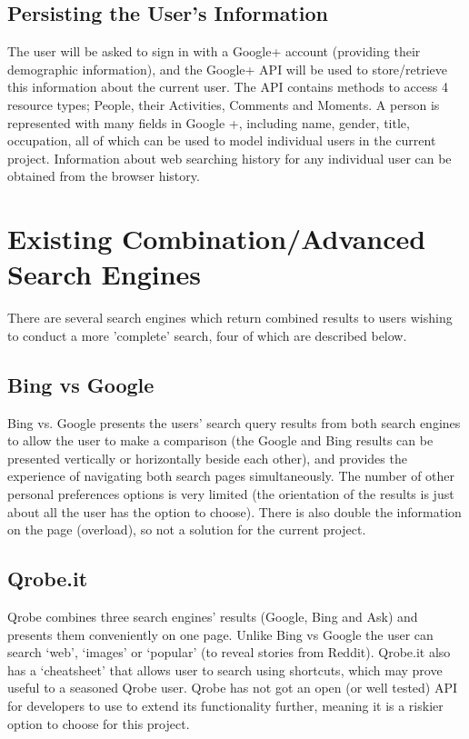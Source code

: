 \documentclass[10pt]{article}
\begin{document}
\subsection{Persisting the User's Information}
The user will be asked to sign in with a Google+ account (providing their demographic information), and the Google+ API will be used to store/retrieve this information about the current user. The API contains methods to access 4 resource  types; People, their Activities, Comments and Moments. A person is represented with many fields in Google +, including name, gender, title, occupation, all of which can be used to model individual users in the current project. Information about web searching history for any individual user can be obtained from the browser history. 

\section{Existing Combination/Advanced Search Engines}\label{Existing Combination/Advanced Search Engines}
There are several search engines which return combined results to users wishing to conduct a more 'complete' search, four of which are described below. 

\subsection{Bing vs Google}
Bing vs. Google presents the users’ search query results from both search engines to allow the user to make a comparison (the Google and Bing results can be presented vertically or horizontally beside each other), and provides the experience of navigating both search pages simultaneously.  
The number of other personal preferences options is very limited (the orientation of the results is just about all the user has the option to choose). There is also double the information on the page (overload), so not a solution for the current project.

\subsection{Qrobe.it}
Qrobe combines three search engines’ results (Google, Bing and Ask) and presents them conveniently on one page. Unlike Bing vs Google the user can search ‘web’, ‘images’ or ‘popular’ (to reveal stories from Reddit). Qrobe.it also has a ‘cheatsheet’ that allows user to search using shortcuts, which may prove useful to a seasoned Qrobe user. Qrobe has not got an open (or well tested) API for developers to use to extend its functionality further, meaning it is a riskier option to choose for this project.
\end{document}
